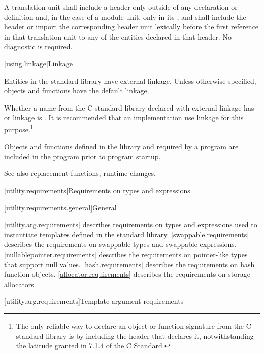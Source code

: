 \pnum
A translation unit shall include a header only outside of any
%
declaration or definition and,
in the case of a module unit,
only in its , and
shall include the header or import the corresponding header unit lexically
before the first reference in that translation unit to any of the entities
declared in that header. No diagnostic is required.

[using.linkage]{Linkage}

\pnum
Entities in the \Cpp{} standard library have external linkage.
Unless otherwise specified, objects and functions have the default
linkage.

\pnum
{}%
Whether a name from the C standard library declared with
external linkage has
%
%
%
or
%
linkage is . It is recommended that an
implementation use
linkage for this purpose.\footnote{The only reliable way to declare an object or
function signature from the C standard library is by including the header that
declares it, notwithstanding the latitude granted in 7.1.4 of the C
Standard.}

\pnum
Objects and functions
defined in the library and required by a \Cpp{} program are included in
the program prior to program startup.

%
\pnum
See also
replacement functions,
runtime changes.

[utility.requirements]{Requirements on types and expressions}

[utility.requirements.general]{General}

\pnum
\ref{utility.arg.requirements}
describes requirements on types and expressions used to instantiate templates
defined in the \Cpp{} standard library.
\ref{swappable.requirements} describes the requirements on swappable types and
swappable expressions.
\ref{nullablepointer.requirements} describes the requirements on pointer-like
types that support null values.
\ref{hash.requirements} describes the requirements on hash function objects.
\ref{allocator.requirements} describes the requirements on storage
allocators.

[utility.arg.requirements]{Template argument requirements}

